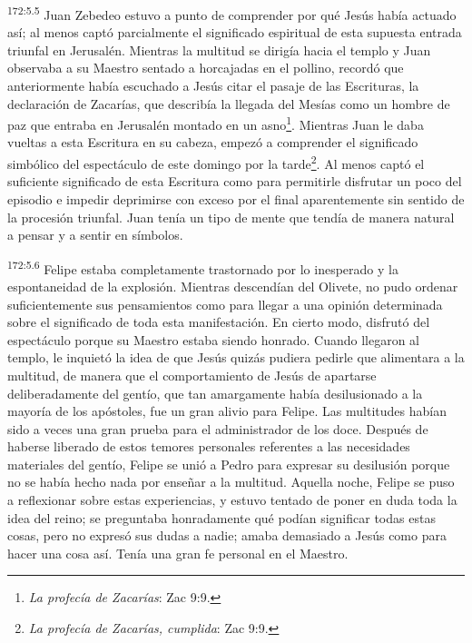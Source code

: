 \par 
\textsuperscript{172:5.5} Juan Zebedeo estuvo a punto de comprender por qué Jesús había actuado así; al menos captó parcialmente el significado espiritual de esta supuesta entrada triunfal en Jerusalén. Mientras la multitud se dirigía hacia el templo y Juan observaba a su Maestro sentado a horcajadas en el pollino, recordó que anteriormente había escuchado a Jesús citar el pasaje de las Escrituras, la declaración de Zacarías, que describía la llegada del Mesías como un hombre de paz que entraba en Jerusalén montado en un asno\footnote{\textit{La profecía de Zacarías}: Zac 9:9.}. Mientras Juan le daba vueltas a esta Escritura en su cabeza, empezó a comprender el significado simbólico del espectáculo de este domingo por la tarde\footnote{\textit{La profecía de Zacarías, cumplida}: Zac 9:9.}. Al menos captó el suficiente significado de esta Escritura como para permitirle disfrutar un poco del episodio e impedir deprimirse con exceso por el final aparentemente sin sentido de la procesión triunfal. Juan tenía un tipo de mente que tendía de manera natural a pensar y a sentir en símbolos.

\par 
\textsuperscript{172:5.6} Felipe estaba completamente trastornado por lo inesperado y la espontaneidad de la explosión. Mientras descendían del Olivete, no pudo ordenar suficientemente sus pensamientos como para llegar a una opinión determinada sobre el significado de toda esta manifestación. En cierto modo, disfrutó del espectáculo porque su Maestro estaba siendo honrado. Cuando llegaron al templo, le inquietó la idea de que Jesús quizás pudiera pedirle que alimentara a la multitud, de manera que el comportamiento de Jesús de apartarse deliberadamente del gentío, que tan amargamente había desilusionado a la mayoría de los apóstoles, fue un gran alivio para Felipe. Las multitudes habían sido a veces una gran prueba para el administrador de los doce. Después de haberse liberado de estos temores personales referentes a las necesidades materiales del gentío, Felipe se unió a Pedro para expresar su desilusión porque no se había hecho nada por enseñar a la multitud. Aquella noche, Felipe se puso a reflexionar sobre estas experiencias, y estuvo tentado de poner en duda toda la idea del reino; se preguntaba honradamente qué podían significar todas estas cosas, pero no expresó sus dudas a nadie; amaba demasiado a Jesús como para hacer una cosa así. Tenía una gran fe personal en el Maestro.

